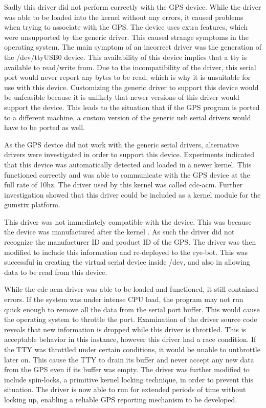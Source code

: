 Sadly this driver did not perform correctly with the GPS device. While the driver was able to be loaded into the kernel without any errors, it caused problems when trying to associate with the GPS. The device uses extra features, which were unsupported by the generic driver. This caused strange symptoms in the operating system. The main symptom of an incorrect driver was the generation of the /dev/ttyUSB0 device. This availability of this device implies that a tty is available to read/write from. Due to the incompatibility of the driver, this serial port would never report any bytes to be read, which is why it is unsuitable for use with this device. Customizing the generic driver to support this device would be unfeasible because it is unlikely that newer versions of this driver would support the device. This leads to the situation that if the GPS program is ported to a different machine, a custom version of the generic usb serial drivers would have to be ported as well.

As the GPS device did not work with the generic serial drivers, alternative drivers were investigated in order to support this device. Experiments indicated that this device was automatically detected and loaded in a newer kernel. This functioned correctly and was able to communicate with the GPS device at the full rate of 10hz. The driver used by this kernel was called cdc-acm. Further investigation showed that this driver could be included as a kernel module for the gumstix platform.

This driver was not immediately compatible with the device. This was because the device was manufactured after the kernel . As such the driver did not recognize the manufacturer ID and product ID of the GPS. The driver was then modified to include this information and re-deployed to the eye-bot. This was successful in creating the virtual serial device inside /dev, and also in allowing data to be read from this device.

While the cdc-acm driver was able to be loaded and functioned, it still contained errors. If the system was under intense CPU load, the program may not run quick enough to remove all the data from the serial port buffer. This would cause the operating system to throttle the port. Examination of the driver source code reveals that new information is dropped while this driver is throttled. This is acceptable behavior in this instance, however this driver had a race condition. If the TTY was throttled under certain conditions, it would be unable to unthrottle later on. This cause the TTY to drain its buffer and never accept any new data from the GPS even if its buffer was empty. The driver was further modified to include spin-locks, a primitive kernel locking technique, in order to prevent this situation. The driver is now able to run for extended periods of time without locking up, enabling a reliable GPS reporting mechanism to be developed. 

